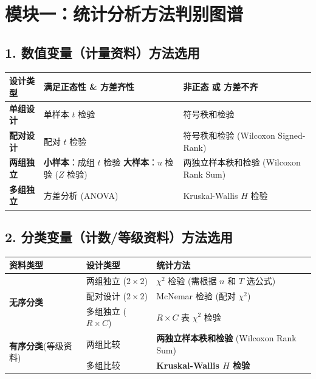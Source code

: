 \documentclass[lang=cn,10pt]{elegantbook}
\begin{document}
\section{模块一：统计分析方法判别图谱}

\subsection{1. 数值变量（计量资料）方法选用}
\begin{table}[htbp]
    \centering
    \small
    \renewcommand{\arraystretch}{1.3}
    \begin{tabular}{p{} p{} p{}}
        \toprule
        \textbf{设计类型} & \textbf{满足正态性 \& 方差齐性} & \textbf{非正态 或 方差不齐} \\
        \midrule
        \textbf{单组设计} & 单样本 $t$ 检验 & 符号秩和检验 \\
        \textbf{配对设计} & 配对 $t$ 检验 & 符号秩和检验 (Wilcoxon Signed-Rank) \\
        \textbf{两组独立} & \textbf{小样本}：成组 $t$ 检验 \newline \textbf{大样本}：$u$ 检验 ($Z$ 检验) & 两独立样本秩和检验 (Wilcoxon Rank Sum) \\
        \textbf{多组独立} & 方差分析 (ANOVA) & Kruskal-Wallis $H$ 检验 \\
        \bottomrule
    \end{tabular}
\end{table}

\subsection{2. 分类变量（计数/等级资料）方法选用}
\begin{table}[htbp]
    \centering
    \small
    \renewcommand{\arraystretch}{1.3}
    \begin{tabular}{p{} p{} p{}}
        \toprule
        \textbf{资料类型} & \textbf{设计类型} & \textbf{统计方法} \\
        \midrule
        \multirow{3}{*}{\textbf{无序分类}} & 两组独立 ($2\times2$) & $\chi^2$ 检验 (需根据 $n$ 和 $T$ 选公式) \\
         & 配对设计 ($2\times2$) & McNemar 检验 (配对 $\chi^2$) \\
         & 多组独立 ($R\times C$) & $R\times C$ 表 $\chi^2$ 检验 \\
        \midrule
        \multirow{2}{*}{\textbf{有序分类}\newline(等级资料)} & 两组比较 & \textbf{两独立样本秩和检验} (Wilcoxon Rank Sum) \\
         & 多组比较 & \textbf{Kruskal-Wallis $H$ 检验} \\
        \bottomrule
    \end{tabular}
\end{table}
\end{document}
